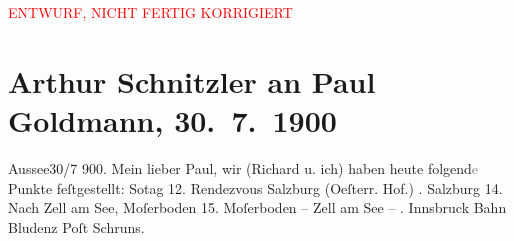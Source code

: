 
\begin{center}
            \textcolor{red}{ENTWURF, NICHT FERTIG KORRIGIERT}
                      \end{center}
            
         
         \renewcommand{\erwaehntePersonen}{Personen: Richard Beer-Hofmann, Paul Goldmann, Alfred Kerr}
         \renewcommand{\erwaehnteOrte}{Orte: Bad Aussee, Berghaus Moserboden, Berlin, Bludenz, Bormio, Hotel und Pension Rudolfshöhe (Leopold Petter), Innsbruck, Iseosee, Italien, Küblis, Pontresina, Salzburg, Schruns, Schweiz, Solda, Sulzfluh, Trafoi, Zell am See, Österreichischer Hof}
         \renewcommand{\erwaehnteWerke}{}
               \section[Arthur Schnitzler an Paul Goldmann, 30. 7. 1900]{ Arthur Schnitzler an Paul Goldmann, 30. 7. 1900}\nopagebreak{}\rehead{ }\begin{ledgroupsized}[t]{13cm}\normalsize\beginnumbering \toendnotes[C]{\smallbreak\pagebreak[2]} 
\pstart
           {\pb}Aussee30/7 900.\pend
           \pstart
           Mein lieber Paul, wir (Richard u. ich) haben heute folgend\textcolor{gray}{e} Punkte
               feſtgestellt:\pend
           \pstart
           So{\geminationn}tag 12. Rendezvous Salzburg (Oeſterr. Hof.) \pend
           . Salzburg 14. Nach Zell am See, Moſerboden
               15. Moſerboden – Zell am See – \pend
           . Innsbruck Bahn Bludenz Poſt Schruns.
                  {\pb}\pend

\end{ledgroupsized}
